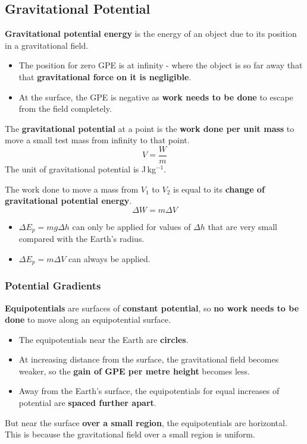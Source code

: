 \subsection{Gravitational Potential}

\textbf{Gravitational potential energy} is the energy of an object due to its position in a gravitational field.
\begin{itemize}
    \item The position for zero GPE is at infinity - where the object is so far away that that \textbf{gravitational force on it is negligible}.
    \item At the surface, the GPE is negative as \textbf{work needs to be done} to escape from the field completely.
\end{itemize}

The \textbf{gravitational potential} at a point is the \textbf{work done per unit mass} to move a small test mass from infinity to that point.
$$V=\frac{W}{m}$$
The unit of gravitational potential is J\,kg$^{-1}$.

The work done to move a mass from $V_1$ to $V_2$ is equal to its \textbf{change of gravitational potential energy}.
$$\Delta W=m\Delta V$$

\begin{itemize}
    \item $\Delta E_p=mg\Delta h$ can only be applied for values of $\Delta h$ that are very small compared with the Earth's radius.
    \item $\Delta E_p=m\Delta V$ can always be applied.
\end{itemize}

\subsubsection*{Potential Gradients}

\textbf{Equipotentials} are surfaces of \textbf{constant potential}, so \textbf{no work needs to be done} to move along an equipotential surface.

\begin{itemize}
    \item The equipotentials near the Earth are \textbf{circles}.
    \item At increasing distance from the surface, the gravitational field becomes weaker, so the \textbf{gain of GPE per metre height} becomes less.
    \item Away from the Earth's surface, the equipotentials for equal increases of potential are \textbf{spaced further apart}.
\end{itemize}
But near the surface \textbf{over a small region}, the equipotentials are horizontal. This is because the gravitational field over a small region is uniform.

